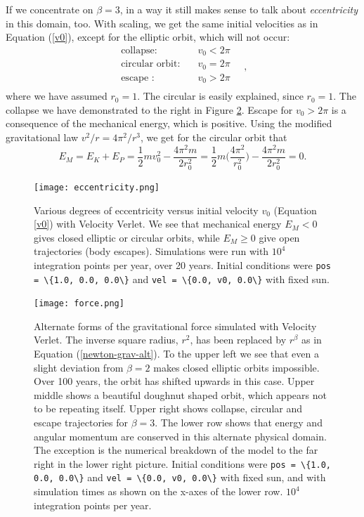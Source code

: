 \documentclass[]{article}
\begin{document}
If we concentrate on $\beta = 3$, in a way it still makes sense to talk about \textit{eccentricity} in this domain, too. With scaling, we get the same initial velocities as in Equation (\ref{v0}), except for the elliptic orbit, which will not occur:
\begin{equation} \label{v0}
\begin{aligned}
	\text{collapse:}& \quad v_0 < 2 \pi \\
	\text{circular orbit:}& \quad v_0 = 2 \pi \\
	\text{escape :}& \quad v_0 > 2 \pi \\
\end{aligned} \quad,
\end{equation}
where we have assumed $r_0 = 1$. The circular is easily explained, since $r_0 = 1$. The collapse we have demonstrated to the right in Figure \ref{fig:force}. Escape for $v_0 > 2\pi$ is a consequence of the mechanical energy, which is positive. Using the modified gravitational law $v^2/r = 4\pi^2/r^3$, we get for the circular orbit that
\begin{equation}
	E_M = E_K + E_P = \frac{1}{2}mv_0^2 - \frac{4\pi^2 m}{2r_0^2} = \frac{1}{2}m \bigg(\frac{4\pi^2}{r_0^2} \bigg) - \frac{4\pi^2 m}{2r_0^2} = 0.
\end{equation}

\begin{figure}[!htb]
	\centering
	\texttt{[image: eccentricity.png]}
	\caption{Various degrees of eccentricity versus initial velocity $v_0$ (Equation \ref{v0}) with Velocity Verlet. We see that mechanical energy $E_M < 0$ gives closed elliptic or circular orbits, while $E_M \ge 0$ give open trajectories (body escapes). Simulations were run with $10^4$ integration points per year, over 20 years. Initial conditions were \lstinline|pos = \{1.0, 0.0, 0.0\}| and \lstinline|vel = \{0.0, v0, 0.0\}| with fixed sun.}
	\label{fig:eccentricity}
\end{figure}

\begin{figure}[!htb]
	\centering
	\texttt{[image: force.png]}
	\caption{Alternate forms of the gravitational force simulated with Velocity Verlet. The inverse square radius, $r^2$, has been replaced by $r^{\beta}$ as in Equation (\ref{newton-grav-alt}). To the upper left we see that even a slight deviation from $\beta=2$ makes closed elliptic orbits impossible. Over 100 years, the orbit has shifted upwards in this case. Upper middle shows a beautiful doughnut shaped orbit, which appears not to be repeating itself. Upper right shows collapse, circular and escape trajectories for $\beta = 3$. The lower row shows that energy and angular momentum are conserved in this alternate physical domain. The exception is the numerical breakdown of the model to the far right in the lower right picture. Initial conditions were \lstinline|pos = \{1.0, 0.0, 0.0\}| and \lstinline|vel = \{0.0, v0, 0.0\}| with fixed sun, and with simulation times as shown on the x-axes of the lower row. $10^4$ integration points per year.}
	\label{fig:force}
\end{figure}
\end{document}
